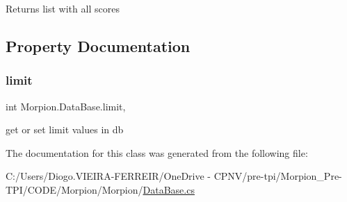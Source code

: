 \begin{DoxyReturn}{Returns}
list with all scores
\end{DoxyReturn}


\subsection{Property Documentation}
\mbox{\label{class_morpion_1_1_data_base_ac0104fe497ec69fc184498e3e904b41f}} 
\subsubsection{\texorpdfstring{limit}{limit}}
{\footnotesize\ttfamily int Morpion.\+Data\+Base.\+limit\hspace{0.3cm}{\ttfamily [get]}, {\ttfamily [set]}}



get or set limit values in db 



The documentation for this class was generated from the following file\+:\begin{DoxyCompactItemize}
\item 
C\+:/\+Users/\+Diogo.\+V\+I\+E\+I\+R\+A-\/\+F\+E\+R\+R\+E\+I\+R/\+One\+Drive -\/ C\+P\+N\+V/pre-\/tpi/\+Morpion\+\_\+\+Pre-\/\+T\+P\+I/\+C\+O\+D\+E/\+Morpion/\+Morpion/\hyperlink{_data_base_8cs}{Data\+Base.\+cs}\end{DoxyCompactItemize}
